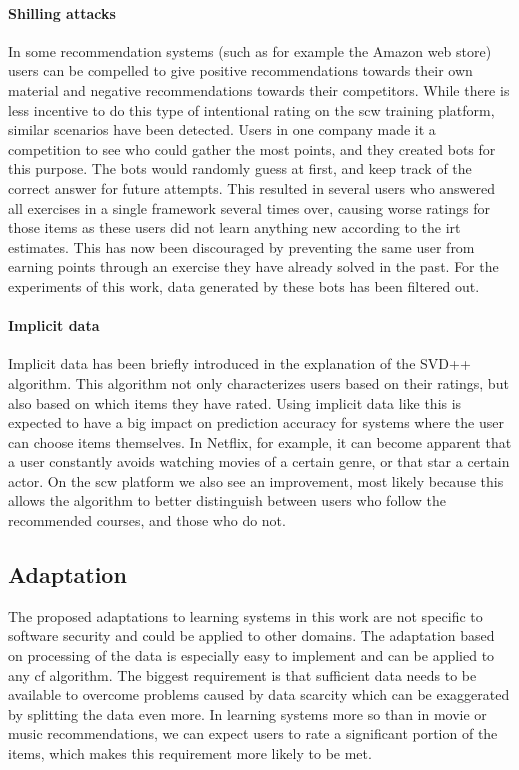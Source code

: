 \paragraph{Shilling attacks}
In some recommendation systems (such as for example the Amazon web store) users can be compelled to give positive recommendations towards their own material and negative recommendations towards their competitors.
While there is less incentive to do this type of intentional rating on the \gls{scw} training platform, similar scenarios have been detected.
Users in one company made it a competition to see who could gather the most points, and they created bots for this purpose.
The bots would randomly guess at first, and keep track of the correct answer for future attempts.
This resulted in several users who answered all exercises in a single framework several times over, causing worse ratings for those items as these users did not learn anything new according to the \gls{irt} estimates.
This has now been discouraged by preventing the same user from earning points through an exercise they have already solved in the past.
For the experiments of this work, data generated by these bots has been filtered out.

\paragraph{Implicit data}
Implicit data has been briefly introduced in the explanation of the SVD++ algorithm.
This algorithm not only characterizes users based on their ratings, but also based on which items they have rated.
Using implicit data like this is expected to have a big impact on prediction accuracy for systems where the user can choose items themselves.
In Netflix, for example, it can become apparent that a user constantly avoids watching movies of a certain genre, or that star a certain actor.
On the \gls{scw} platform we also see an improvement, most likely because this allows the algorithm to better distinguish between users who follow the recommended courses, and those who do not.

\subsection{Adaptation}
The proposed adaptations to learning systems in this work are not specific to software security and could be applied to other domains.
The adaptation based on processing of the data is especially easy to implement and can be applied to any \gls{cf} algorithm.
The biggest requirement is that sufficient data needs to be available to overcome problems caused by data scarcity which can be exaggerated by splitting the data even more.
In learning systems more so than in movie or music recommendations, we can expect users to rate a significant portion of the items, which makes this requirement more likely to be met.

